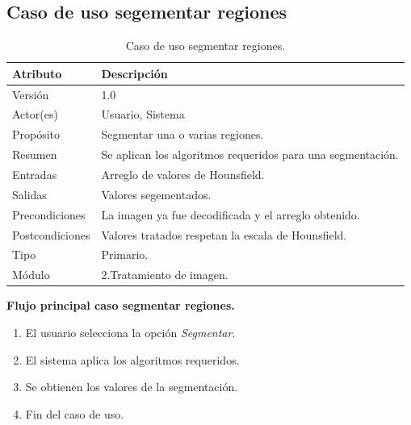 \documentclass[12pt]{report}
\begin{document}
\subsection{Caso de uso segementar regiones}
\begin{table}[H]
\begin{center}
\begin{tabular}{|p{25mm}|p{60mm}|}
\hline
Atributo & Descripción\\
\hline \hline 
Versión & 1.0\\
\hline
Actor(es) & Usuario, Sistema\\
\hline
Propósito & Segmentar una o varias regiones.\\
\hline
Resumen & Se aplican los algoritmos requeridos para una segmentación.\\
\hline
Entradas & Arreglo de valores de Hounsfield.\\
\hline
Salidas & Valores segementados.\\
\hline
Precondiciones & La imagen ya fue decodificada y el arreglo obtenido.\\
\hline
Postcondiciones & Valores tratados respetan la escala de Hounsfield.\\
\hline
Tipo & Primario.\\
\hline 
Módulo & 2.Tratamiento de imagen.\\
\hline
\end{tabular}
\caption{Caso de uso segmentar regiones.}
\end{center}
\end{table}

\textbf{Flujo principal caso segmentar regiones. }
\begin{enumerate}
\item El usuario selecciona la opción \textit{Segmentar}.
\item El sistema aplica los algoritmos requeridos.
\item Se obtienen los valores de la segmentación.
\item Fin del caso de uso.
\end{enumerate}
\end{document}
